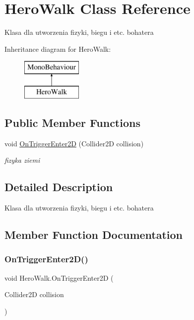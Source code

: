 \hypertarget{class_hero_walk}{}\section{Hero\+Walk Class Reference}
\label{class_hero_walk}


Klasa dla utworzenia fizyki, biegu i etc. bohatera  


Inheritance diagram for Hero\+Walk\+:\begin{figure}[H]
\begin{center}
\leavevmode
\includegraphics[height=2.000000cm]{class_hero_walk}
\end{center}
\end{figure}
\subsection*{Public Member Functions}
\begin{DoxyCompactItemize}
\item 
void \hyperlink{class_hero_walk_a438d7c97d2160c30063a1fddf50b7d71}{On\+Trigger\+Enter2D} (Collider2D collision)
\begin{DoxyCompactList}\small\item\em fizyka ziemi \end{DoxyCompactList}\end{DoxyCompactItemize}


\subsection{Detailed Description}
Klasa dla utworzenia fizyki, biegu i etc. bohatera 



\subsection{Member Function Documentation}
\mbox{\label{class_hero_walk_a438d7c97d2160c30063a1fddf50b7d71}} 
\subsubsection{\texorpdfstring{On\+Trigger\+Enter2\+D()}{OnTriggerEnter2D()}}
{\footnotesize\ttfamily void Hero\+Walk.\+On\+Trigger\+Enter2D (\begin{DoxyParamCaption}\item[{Collider2D}]{collision }\end{DoxyParamCaption})}



